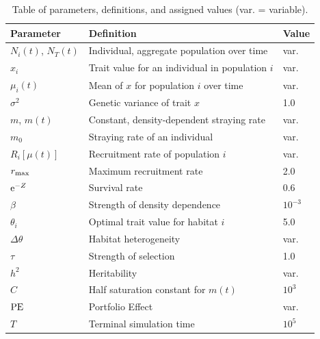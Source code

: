 \documentclass{revtex4}
\begin{document}
\clearpage

\begin{table}[!t]
\begin{center}
\begin{tabular}{ l l l }
\hline
Parameter & Definition & Value \\
\hline
$N_i(t)$, $N_T(t)$ & Individual, aggregate population over time & {\rm var.}\\
$x_i$ & Trait value for an individual in population $i$ & {\rm var.}\\
$\mu_i(t)$ & Mean of $x$ for population $i$ over time & {\rm var.}\\
$\sigma^2$ & Genetic variance of trait $x$ & 1.0\\
$m$, $m(t)$ & Constant, density-dependent straying rate & {\rm var.}\\
$m_0$ & Straying rate of an individual & {\rm var.}\\
$R_i[\mu(t)]$ & Recruitment rate of population $i$ & {\rm var.}\\
$r_{\rm max}$ & Maximum recruitment rate & 2.0\\
${\rm e}^{-Z}$ & Survival rate & 0.6\\
$\beta$ & Strength of density dependence & $10^{-3}$\\
$\theta_i$ & Optimal trait value for habitat $i$ & 5.0\\
$\Delta\theta$ & Habitat heterogeneity & {\rm var.}\\
$\tau$ & Strength of selection & 1.0\\
$h^2$ & Heritability & {\rm var.}\\
$C$ & Half saturation constant for $m(t)$ &  $10^3$\\
${\rm PE}$ & Portfolio Effect & {\rm var.}\\
$T$ & Terminal simulation time & $10^5$\\
\hline
\end{tabular}
\end{center}
\caption{Table of parameters, definitions, and assigned values (var. = variable).}
\end{table}


\clearpage
\end{document}
